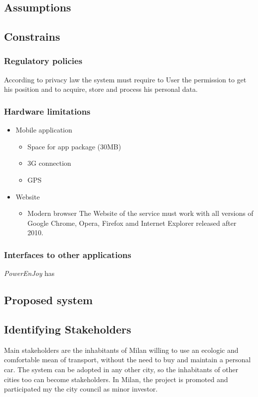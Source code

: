\documentclass{article}
\begin{document}
		\subsection{Assumptions}
		

		\subsection{Constrains}
			\subsubsection{Regulatory policies}
				According to privacy law the system must require to User the permission to get his position and to acquire, store and process his personal data.
			\subsubsection{Hardware limitations}
				\begin{itemize}
				\item Mobile application
				\begin{itemize}
				\item Space for app package (30MB)	
				\item 3G connection
				\item GPS
				\end{itemize}
				\item Website
				\begin{itemize}
					\item Modern browser
				The Website of the service must work with all versions of Google Chrome, Opera, Firefox amd Internet Explorer released after 2010.	
				\end{itemize}
				\end{itemize}
			\subsubsection{Interfaces to other applications}
			\textit{PowerEnJoy}  has
						
				  	

		\subsection{Proposed system}

		\subsection{Identifying Stakeholders}
			Main stakeholders are the inhabitants of Milan willing to use an ecologic and comfortable mean of transport, without the need to buy and maintain a personal car.
			The system can be adopted in any other city, so the inhabitants of other cities too can become stakeholders.
			In Milan, the project is promoted and participated my the city council as minor investor.
\end{document}
